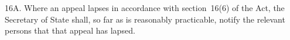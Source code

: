 \documentclass[a4paper,12pt]{article}
\begin{document}
16A.  Where an appeal lapses in accordance with section~16(6) of the Act, the Secretary of State shall, so far as is reasonably practicable, notify the relevant persons that that appeal has lapsed.


%
%
%
%
%
\end{document}
